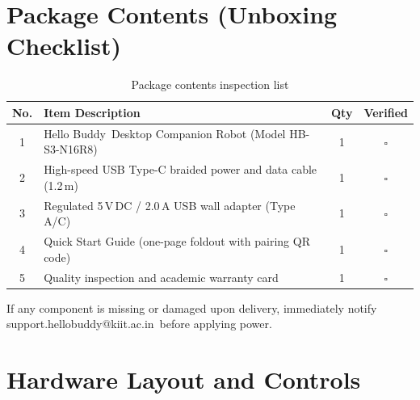 \documentclass[11pt,a4paper,oneside]{report}
\makeatletter
\newcommand{\hdr}[1]{\cellcolor{LightBlue}\textbf{#1}}
\newcommand{\ProductName}{Hello Buddy}
\newcommand{\ModelNo}{HB-S3-N16R8}
\newcommand{\SupportMail}{support.hellobuddy@kiit.ac.in}
\makeatother
\begin{document}
\section{Package Contents (Unboxing Checklist)}\label{sec:box}
\begin{table}[H]\centering\small
\caption{Package contents inspection list}
\begin{tabularx}{\linewidth}{|c|X|c|c|}\hline
\hdr{No.} & \hdr{Item Description} & \hdr{Qty} & \hdr{Verified}\\ \hline
1 & \ProductName\ Desktop Companion Robot (Model \ModelNo) & 1 & $\square$\\ \hline
2 & High-speed USB Type-C braided power and data cable (1.2\,m) & 1 & $\square$\\ \hline
3 & Regulated 5\,V\,DC / 2.0\,A USB wall adapter (Type A/C) & 1 & $\square$\\ \hline
4 & Quick Start Guide (one-page foldout with pairing QR code) & 1 & $\square$\\ \hline
5 & Quality inspection and academic warranty card & 1 & $\square$\\ \hline
\end{tabularx}
\end{table}
If any component is missing or damaged upon delivery, immediately notify \SupportMail\ before applying power.

\section{Hardware Layout and Controls}\label{sec:parts}
\end{document}
